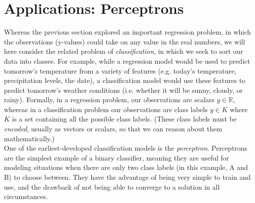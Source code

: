 \documentclass{article}
\begin{document}
\section*{Applications: Perceptrons}
Whereas the previous section explored an important regression problem, in which the observations (y-values) could take on any value in the real numbers, we will here consider the related problem of \textit{classification}, in which we seek to sort our data into classes. For example, while a regression model would be used to predict tomorrow's temperature from a variety of features (e.g. today's temperature, precipitation levels, the date), a classification model would use these features to predict tomorrow's weather conditions (i.e. whether it will be sunny, cloudy, or rainy). Formally, in a regression problem, our observations are scalars $y \in \mathbb{R}$, whereas in a classification problem our observations are class labels $y \in K$ where $K$ is a set containing all the possible class labels. (These class labels must be \textit{encoded}, usually as vectors or scalars, so that we can reason about them mathematically.)\\

\noindent One of the earliest-developed classification models is the \textit{perceptron}. Perceptrons are the simplest example of a binary classifier, meaning they are useful for modeling situations when there are only two class labels (in this example, A and B) to choose between. They have the advantage of being very simple to train and use, and the drawback of not being able to converge to a solution in all circumstances. \\
\end{document}
